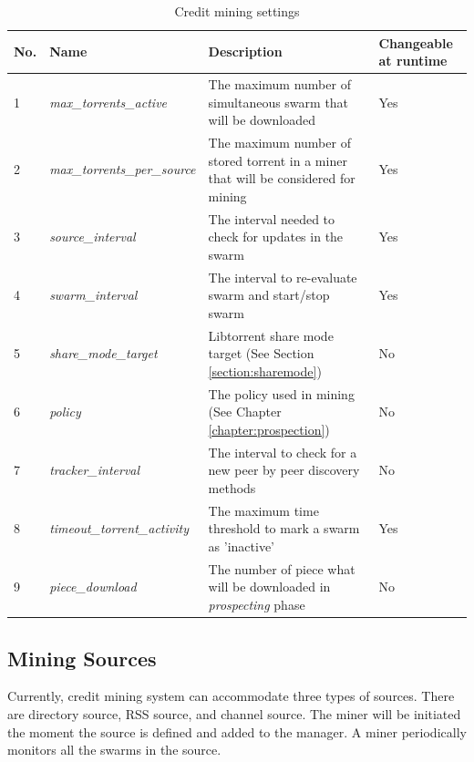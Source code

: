 \begin{table}[h]
	\centering
	\caption{Credit mining settings}
	\label{tbl:cmsettings}
	\begin{adjustwidth}{-1.5cm}{}
	\begin{tabular}{|p{1cm}|p{4cm}|p{7cm}|p{2cm}|}
		\hline
		\rowcolor[HTML]{EFEFEF} 
		No. & Name & Description & Changeable at runtime \\ \hline
	1 & \textit{max\_torrents\_active} & The maximum number of simultaneous swarm that will be downloaded & Yes \\ \hline
	2 & \textit{max\_torrents\_per\_source} & The maximum number of stored torrent in a miner that will be considered for mining & Yes \\ \hline
	3 & \textit{source\_interval} & The interval needed to check for updates in the swarm & Yes \\ \hline
	4 & \textit{swarm\_interval} & The interval to re-evaluate swarm and start/stop swarm & Yes \\ \hline
	5 & \textit{share\_mode\_target} & Libtorrent share mode target (See Section \ref{section:sharemode}) & No \\ \hline
	6 & \textit{policy} & The policy used in mining (See Chapter \ref{chapter:prospection}) & No \\ \hline
	7 & \textit{tracker\_interval} & The interval to check for a new peer by peer discovery methods & No \\ \hline
	8 & \textit{timeout\_torrent\_activity} & The maximum time threshold to mark a swarm as 'inactive' & Yes \\ \hline
	9 & \textit{piece\_download} & The number of piece what will be downloaded in \textit{prospecting} phase & No \\ \hline
	\end{tabular}
	\end{adjustwidth}
\end{table}




\subsection{Mining Sources}
\label{section:msource} 
Currently, credit mining system can accommodate three types of sources. There are directory source, RSS source, and channel source. The miner will be initiated the moment the source is defined and added to the manager. A miner periodically monitors all the swarms in the source.

